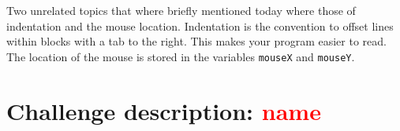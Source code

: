 Two unrelated topics that where briefly mentioned today where those of indentation and the mouse location. Indentation is the convention to offset lines within blocks with a tab to the right. This makes your program easier to read. The location of the mouse is stored in the variables \texttt{mouseX} and \texttt{mouseY}.


\section{Challenge description: \textcolor{red}{name}}
